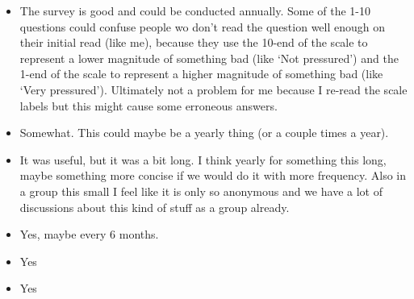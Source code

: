 \documentclass[
]{book}
\providecommand{\tightlist}{%
  \setlength{\itemsep}{0pt}\setlength{\parskip}{0pt}}
\begin{document}
\begin{itemize}
\tightlist
\item
  The survey is good and could be conducted annually. Some of the 1-10 questions could confuse people wo don't read the question well enough on their initial read (like me), because they use the 10-end of the scale to represent a lower magnitude of something bad (like `Not pressured') and the 1-end of the scale to represent a higher magnitude of something bad (like `Very pressured'). Ultimately not a problem for me because I re-read the scale labels but this might cause some erroneous answers.
\item
  Somewhat. This could maybe be a yearly thing (or a couple times a year).
\item
  It was useful, but it was a bit long. I think yearly for something this long, maybe something more concise if we would do it with more frequency. Also in a group this small I feel like it is only so anonymous and we have a lot of discussions about this kind of stuff as a group already.\\
\item
  Yes, maybe every 6 months.
\item
  Yes
\item
  Yes
\end{itemize}
\end{document}
